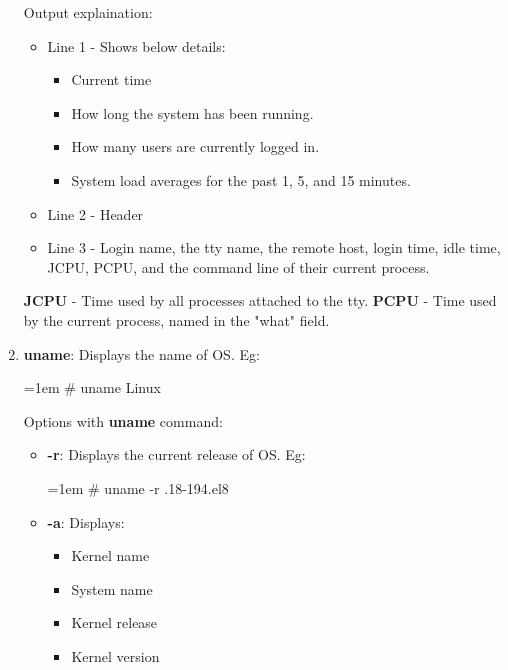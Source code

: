 \begin{flushleft}
\begin{enumerate}
			Output explaination:
			\begin{itemize}
				\item Line 1 - Shows below details:
				\begin{itemize}
					\item Current time
					\item How long the system has been running.
					\item How many users are currently logged in.
					\item System load averages for the past 1, 5, and 15 minutes.
				\end{itemize}
				\item Line 2 - Header
				\item Line 3 - Login name, the tty name, the remote host, login time, idle time, JCPU, PCPU, and the command line of their current process.
			\end{itemize}
			\bigskip
			\bigskip
			\textbf{JCPU} - Time used by all processes attached to the tty.
			\newline
			\textbf{PCPU} - Time used by the current process, named in the "what" field.
		\bigskip
		\item \textbf{uname}: Displays the name of OS.
		\newline
		Eg:
		\begin{tcolorbox}[breakable,notitle,boxrule=-0pt,colback=black,colframe=black]
			\color{green}
			\font=1em
			\# uname
			\newline
			\color{white}
			Linux
			\font=4pt
		\end{tcolorbox}
		Options with \textbf{uname} command:
		\begin{itemize}
			\item \textbf{-r}: Displays the current release of OS.
			\newline
			Eg:
			\begin{tcolorbox}[breakable,notitle,boxrule=-0pt,colback=black,colframe=black]
				\color{green}
				\font=1em
				\# uname -r
				\color{white}
				.18-194.el8
				\font=4pt
			\end{tcolorbox}
			\item \textbf{-a}: Displays:
			\begin{itemize}
				\item Kernel name 
				\item System name 
				\item Kernel release
				\item Kernel version

\end{itemize}
\end{itemize}
\end{enumerate}
\end{flushleft}
